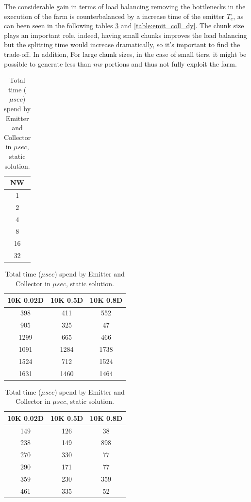 The considerable gain in terms of load balancing removing the bottlenecks in the execution of the farm is counterbalanced by a increase time of the emitter $T_e$, as can been seen in the following tables \ref{table:emit_coll} and \ref{table:emit_coll_dy}. The chunk size plays an important role, indeed, having small chunks improves the load balancing but the splitting time would increase dramatically, so it's important to find the trade-off. In addition, For large chunk sizes, in the case of small tiers, it might be possible to generate less than $nw$ portions and thus not fully exploit the farm.

\begin{table}[!htb]
\centering
\begin{minipage}{0.08\textwidth}
\centering
\begin{tabular}{|c|}
\hline
NW \\ \hline
1          \\ \hline
2      \\ \hline
4           \\ \hline
8            \\ \hline
16       \\ \hline
32          \\ \hline
\end{tabular}
\end{minipage}
\begin{minipage}{0.43\textwidth}
\centering
\begin{tabular}{|c|c|c|}
\hline
 10K 0.02D & 10K 0.5D & 10K 0.8D \\ \hline
 398       & 411      & 552      \\ \hline
905       & 325      & 47       \\ \hline
 1299      & 665      & 466      \\ \hline
1091      & 1284     & 1738     \\ \hline
1524      & 712      & 1524     \\ \hline
1631      & 1460     & 1464     \\ \hline
\end{tabular}

\end{minipage}
\begin{minipage}{0.43\textwidth}
\centering
\begin{tabular}{|c|c|c|}
\hline
 10K 0.02D & 10K 0.5D & 10K 0.8D \\ \hline
149       & 126      & 38       \\ \hline
238       & 149      & 898      \\ \hline
270       & 330      & 77       \\ \hline
290       & 171      & 77       \\ \hline
359       & 230      & 359      \\ \hline
461       & 335      & 52       \\ \hline
\end{tabular}
\end{minipage}
\caption{Total time ($\mu sec$) spend by Emitter and Collector in $\mu sec$, static solution.}
\label{table:emit_coll}
\end{table}

